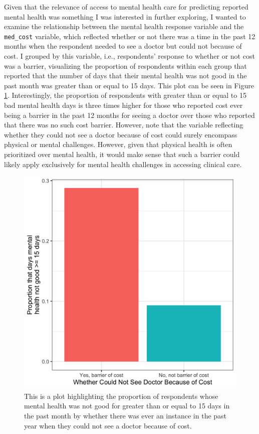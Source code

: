 \documentclass[
]{article}
\begin{document}
Given that the relevance of access to mental health care for predicting reported mental health was something I was interested in further exploring, I wanted to examine the relationship between the mental health response variable and the \texttt{med\_cost} variable, which reflected whether or not there was a time in the past 12 months when the respondent needed to see a doctor but could not because of cost. I grouped by this variable, i.e., respondents' response to whether or not cost was a barrier, visualizing the proportion of respondents within each group that reported that the number of days that their mental health was not good in the past month was greater than or equal to 15 days. This plot can be seen in Figure \ref{fig:mental-health-vs-med-cost}. Interestingly, the proportion of respondents with greater than or equal to 15 bad mental health days is three times higher for those who reported cost ever being a barrier in the past 12 months for seeing a doctor over those who reported that there was no such cost barrier. However, note that the variable reflecting whether they could not see a doctor because of cost could surely encompass physical or mental challenges. However, given that physical health is often prioritized over mental health, it would make sense that such a barrier could likely apply exclusively for mental health challenges in accessing clinical care.

\begin{figure}[H]

{\centering \includegraphics[width=0.65\linewidth]{../results/mental-health-vs-med-cost} 

}

\caption{This is a plot highlighting the proportion of respondents whose mental health was not good for greater than or equal to 15 days in the past month by whether there was ever an instance in the past year when they could not see a doctor because of cost.}\label{fig:mental-health-vs-med-cost}
\end{figure}
\end{document}
